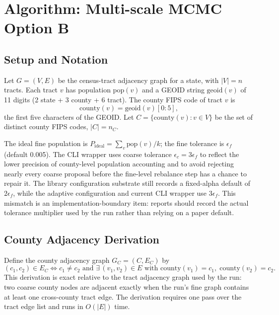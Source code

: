 \section{Algorithm: Multi-scale MCMC Option B}
\label{sec:algorithm}

\subsection{Setup and Notation}

Let $G = (V, E)$ be the census-tract adjacency graph for a state, with
$|V| = n$ tracts.
Each tract $v$ has population $\mathrm{pop}(v)$ and a GEOID string
$\mathrm{geoid}(v)$ of 11 digits (2 state + 3 county + 6 tract).
The county FIPS code of tract $v$ is
\[
  \mathrm{county}(v) = \mathrm{geoid}(v)[0{:}5],
\]
the first five characters of the GEOID.
Let $C = \{\mathrm{county}(v) : v \in V\}$ be the set of distinct county
FIPS codes, $|C| = n_C$.

The ideal fine population is $P_{\mathrm{ideal}} = \sum_v \mathrm{pop}(v) / k$;
the fine tolerance is $\epsilon_f$ (default 0.005).
The CLI wrapper uses coarse tolerance $\epsilon_c = 3 \epsilon_f$ to reflect
the lower precision of county-level population accounting and to avoid rejecting
nearly every coarse proposal before the fine-level rebalance step has a chance
to repair it.
The library configuration substrate still records a fixed-alpha default of
$2\epsilon_f$, while the adaptive configuration and current CLI wrapper use
$3\epsilon_f$.
This mismatch is an implementation-boundary item: reports should record the
actual tolerance multiplier used by the run rather than relying on a paper
default.

\subsection{County Adjacency Derivation}

\begin{proposition}
\label{prop:county-adj-exact}
Define the county adjacency graph $G_C = (C, E_C)$ by
\[
  (c_1, c_2) \in E_C
  \iff c_1 \neq c_2
  \text{ and }
  \exists\, (v_1, v_2) \in E \text{ with }
  \mathrm{county}(v_1) = c_1,\;
  \mathrm{county}(v_2) = c_2.
\]
This derivation is exact relative to the tract adjacency graph used by the run:
two coarse county nodes are adjacent exactly when the run's fine graph contains
at least one cross-county tract edge.
The derivation requires one pass over the tract edge list and runs in $O(|E|)$
time.
\end{proposition}


